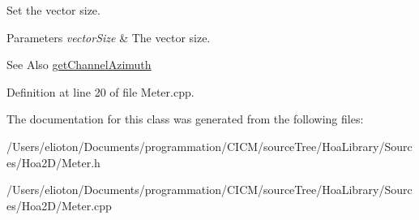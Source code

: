 Set the vector size. 


\begin{DoxyParams}{Parameters}
{\em vector\-Size} & The vector size. \\
\hline
\end{DoxyParams}
\begin{DoxySeeAlso}{See Also}
\hyperlink{class_hoa2_d_1_1_meter_a2f179adb5ec28fe4c2256c8333ea22ab}{get\-Channel\-Azimuth} 
\end{DoxySeeAlso}


Definition at line 20 of file Meter.\-cpp.



The documentation for this class was generated from the following files\-:\begin{DoxyCompactItemize}
\item 
/\-Users/elioton/\-Documents/programmation/\-C\-I\-C\-M/source\-Tree/\-Hoa\-Library/\-Sources/\-Hoa2\-D/Meter.\-h\item 
/\-Users/elioton/\-Documents/programmation/\-C\-I\-C\-M/source\-Tree/\-Hoa\-Library/\-Sources/\-Hoa2\-D/Meter.\-cpp\end{DoxyCompactItemize}
